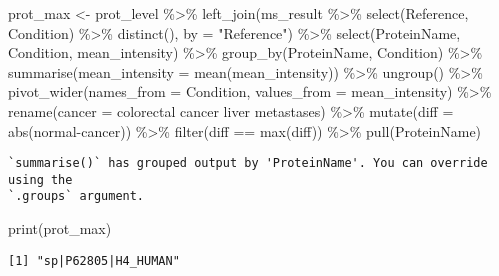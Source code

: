 \documentclass[
  letterpaper,
  DIV=11,
  numbers=noendperiod]{scrartcl}
\newenvironment{Shaded}{\begin{snugshade}}{\end{snugshade}}
\newcommand{\AttributeTok}[1]{\textcolor[rgb]{0.40,0.45,0.13}{#1}}
\newcommand{\FunctionTok}[1]{\textcolor[rgb]{0.28,0.35,0.67}{#1}}
\newcommand{\NormalTok}[1]{\textcolor[rgb]{0.00,0.23,0.31}{#1}}
\newcommand{\OtherTok}[1]{\textcolor[rgb]{0.00,0.23,0.31}{#1}}
\newcommand{\SpecialCharTok}[1]{\textcolor[rgb]{0.37,0.37,0.37}{#1}}
\newcommand{\StringTok}[1]{\textcolor[rgb]{0.13,0.47,0.30}{#1}}
\begin{document}
\begin{Shaded}
\begin{Highlighting}[]
\NormalTok{prot\_max }\OtherTok{\textless{}{-}}\NormalTok{ prot\_level }\SpecialCharTok{\%\textgreater{}\%} 
    \FunctionTok{left\_join}\NormalTok{(ms\_result }\SpecialCharTok{\%\textgreater{}\%} \FunctionTok{select}\NormalTok{(Reference, Condition) }\SpecialCharTok{\%\textgreater{}\%} \FunctionTok{distinct}\NormalTok{(), }\AttributeTok{by =} \StringTok{"Reference"}\NormalTok{) }\SpecialCharTok{\%\textgreater{}\%}
    \FunctionTok{select}\NormalTok{(ProteinName, Condition, mean\_intensity) }\SpecialCharTok{\%\textgreater{}\%}
    \FunctionTok{group\_by}\NormalTok{(ProteinName, Condition) }\SpecialCharTok{\%\textgreater{}\%} 
    \FunctionTok{summarise}\NormalTok{(}\AttributeTok{mean\_intensity =} \FunctionTok{mean}\NormalTok{(mean\_intensity)) }\SpecialCharTok{\%\textgreater{}\%} 
    \FunctionTok{ungroup}\NormalTok{() }\SpecialCharTok{\%\textgreater{}\%}
    \FunctionTok{pivot\_wider}\NormalTok{(}\AttributeTok{names\_from =}\NormalTok{ Condition, }\AttributeTok{values\_from =}\NormalTok{ mean\_intensity) }\SpecialCharTok{\%\textgreater{}\%} 
    \FunctionTok{rename}\NormalTok{(}\AttributeTok{cancer =} \StringTok{\textasciigrave{}}\AttributeTok{colorectal cancer liver metastases}\StringTok{\textasciigrave{}}\NormalTok{) }\SpecialCharTok{\%\textgreater{}\%} 
    \FunctionTok{mutate}\NormalTok{(}\AttributeTok{diff =} \FunctionTok{abs}\NormalTok{(normal}\SpecialCharTok{{-}}\NormalTok{cancer)) }\SpecialCharTok{\%\textgreater{}\%}
    \FunctionTok{filter}\NormalTok{(diff }\SpecialCharTok{==} \FunctionTok{max}\NormalTok{(diff)) }\SpecialCharTok{\%\textgreater{}\%}
    \FunctionTok{pull}\NormalTok{(ProteinName)}
\end{Highlighting}
\end{Shaded}

\begin{verbatim}
`summarise()` has grouped output by 'ProteinName'. You can override using the
`.groups` argument.
\end{verbatim}

\begin{Shaded}
\begin{Highlighting}[]
\FunctionTok{print}\NormalTok{(prot\_max)}
\end{Highlighting}
\end{Shaded}

\begin{verbatim}
[1] "sp|P62805|H4_HUMAN"
\end{verbatim}
\end{document}
